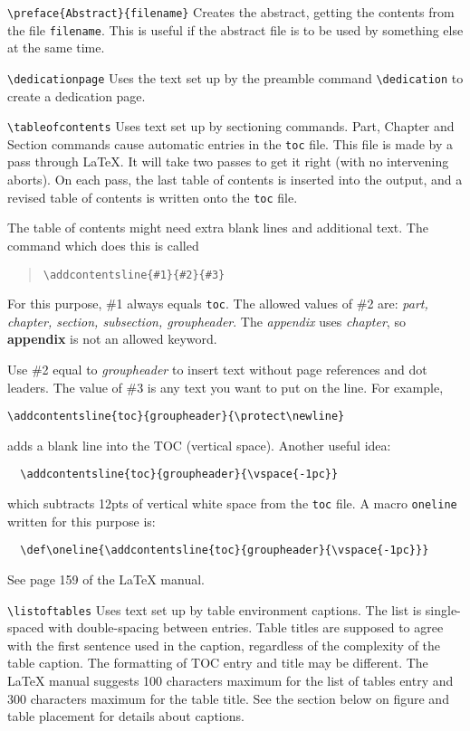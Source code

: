 \begin{description}
\item \verb|\preface{Abstract}{filename}| Creates the abstract, getting
the contents from the file \verb|filename|.
This is useful if the abstract file is to be used by something else
at the same time.

\item \verb|\dedicationpage|
Uses the text set up by the preamble command \verb|\dedication|
to create a dedication page.

\item \verb|\tableofcontents|
Uses text set up by sectioning commands. Part, Chapter and Section
commands cause automatic entries in the \verb|toc| file. This
file is made by a pass through \LaTeX{}. It will take two passes to get
it right (with no intervening aborts). On each pass, the last table of
contents is inserted into the output, and a revised table of contents is
written onto the \verb|toc| file.

The table of contents might need extra blank lines and additional text.
The command which does this is called
\begin{quote}
\verb|\addcontentsline{#1}{#2}{#3}|
\end{quote}
For this purpose, \#1 always equals \verb|toc|. The allowed values of
\#2 are: {\em part, chapter, section, subsection, groupheader}. The {\em
appendix} uses {\em chapter}, so {\bf appendix} is not an allowed keyword.

Use \#2 equal to {\em groupheader} to insert text without page
references and dot leaders. The value of \#3 is any text you want to put
on the line. For
example,

\verb|\addcontentsline{toc}{groupheader}{\protect\newline}|

adds a blank line into the TOC (vertical space).
Another useful idea:

\verb|  \addcontentsline{toc}{groupheader}{\vspace{-1pc}}|

which subtracts 12pts of vertical white space from the \verb|toc| file.
A macro {\tt oneline} written for this purpose is:

\verb|  \def\oneline{\addcontentsline{toc}{groupheader}{\vspace{-1pc}}}|

See page 159 of the \LaTeX{} manual.

\item \verb|\listoftables|
Uses text set up by table environment captions. The list is
single-spaced with double-spacing between entries. Table titles are
supposed to agree with the first sentence used in the caption,
regardless of the complexity of the table caption. The formatting of TOC
entry and title may be different. The \LaTeX{} manual suggests 100
characters maximum for the list of tables entry and 300 characters
maximum for the table title. See the section below on figure and table
placement for details about captions.


\end{description}
